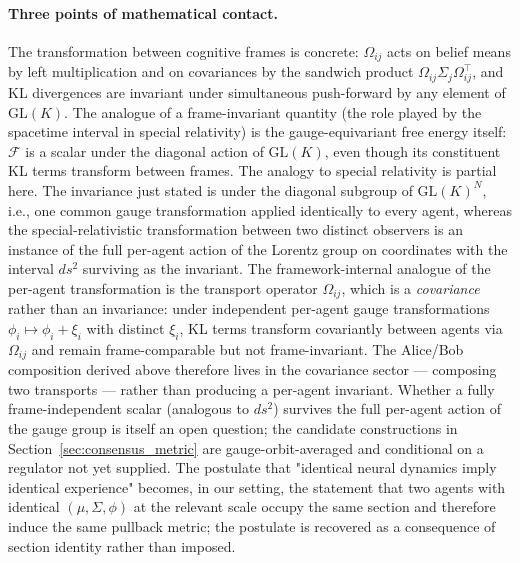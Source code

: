 \documentclass[11pt]{article}
\begin{document}
\paragraph{Three points of mathematical contact.}
The transformation between cognitive frames is concrete: $\Omega_{ij}$ acts on belief means by left multiplication and on covariances by the sandwich product $\Omega_{ij} \Sigma_j \Omega_{ij}^\top$, and KL divergences are invariant under simultaneous push-forward by any element of $\mathrm{GL}(K)$. The analogue of a frame-invariant quantity (the role played by the spacetime interval in special relativity) is the gauge-equivariant free energy itself: $\mathcal{F}$ is a scalar under the diagonal action of $\mathrm{GL}(K)$, even though its constituent KL terms transform between frames. The analogy to special relativity is partial here. The invariance just stated is under the diagonal subgroup of $\mathrm{GL}(K)^N$, i.e., one common gauge transformation applied identically to every agent, whereas the special-relativistic transformation between two distinct observers is an instance of the full per-agent action of the Lorentz group on coordinates with the interval $ds^2$ surviving as the invariant. The framework-internal analogue of the per-agent transformation is the transport operator $\Omega_{ij}$, which is a \emph{covariance} rather than an invariance: under independent per-agent gauge transformations $\phi_i \mapsto \phi_i + \xi_i$ with distinct $\xi_i$, KL terms transform covariantly between agents via $\Omega_{ij}$ and remain frame-comparable but not frame-invariant. The Alice/Bob composition derived above therefore lives in the covariance sector — composing two transports — rather than producing a per-agent invariant. Whether a fully frame-independent scalar (analogous to $ds^2$) survives the full per-agent action of the gauge group is itself an open question; the candidate constructions in Section~\ref{sec:consensus_metric} are gauge-orbit-averaged and conditional on a regulator not yet supplied. The postulate that "identical neural dynamics imply identical experience" becomes, in our setting, the statement that two agents with identical $(\mu, \Sigma, \phi)$ at the relevant scale occupy the same section and therefore induce the same pullback metric; the postulate is recovered as a consequence of section identity rather than imposed.
\end{document}
